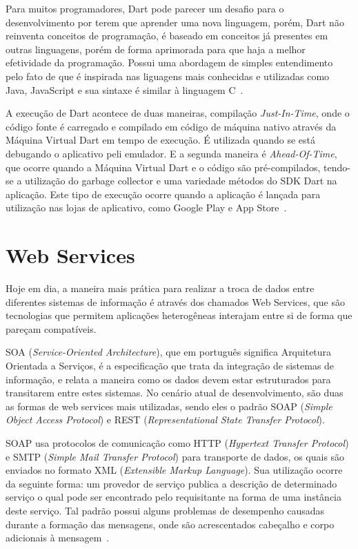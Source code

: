Para muitos programadores, Dart pode parecer um desafio para o desenvolvimento por terem que aprender uma nova linguagem, porém, Dart não reinventa conceitos de programação, é baseado em conceitos já presentes em outras linguagens, porém de forma aprimorada para que haja a melhor efetividade da programação.
Possui uma abordagem de simples entendimento pelo fato de que é inspirada nas liguagens mais conhecidas e utilizadas como Java, JavaScript e sua sintaxe é similar à linguagem C~\cite{clow2019flutter}.

A execução de Dart acontece de duas maneiras, compilação \textit{Just-In-Time}, onde o código fonte é carregado e compilado em código de máquina nativo através da Máquina Virtual Dart em tempo de execução.
É utilizada quando se está debugando o aplicativo peli emulador.
E a segunda maneira é \textit{Ahead-Of-Time}, que ocorre quando a Máquina Virtual Dart e o código são pré-compilados, tendo-se a utilização do garbage collector e uma variedade métodos do SDK Dart na aplicação.
Este tipo de execução ocorre quando a aplicação é lançada para utilização nas lojas de aplicativo, como Google Play e App Store~\cite{napoli2019beginning}.



\section{Web Services}\label{sec:web-services}


Hoje em dia, a maneira mais prática para realizar a troca de dados entre diferentes sistemas de informação é através dos chamados Web Services\cite{tihomirovs2016webservices}, que são tecnologias que permitem aplicações heterogêneas interajam entre si de forma que pareçam compatíveis\cite{eulalio2016webservices}.


SOA (\textit{Service-Oriented Architecture}), que em português significa Arquitetura Orientada a Serviços, é a especificação que trata da integração de sistemas de informação, e relata a maneira como os dados devem estar estruturados para transitarem entre estes sistemas\cite{eulalio2016webservices}.
No cenário atual de desenvolvimento, são duas as formas de web services mais utilizadas, sendo eles o padrão SOAP (\textit{Simple Object Access Protocol}) e REST (\textit{Representational State Transfer Protocol}).

SOAP usa protocolos de comunicação como HTTP (\textit{Hypertext Transfer Protocol}) e SMTP (\textit{Simple Mail Transfer Protocol}) para transporte de dados, os quais são enviados no formato XML (\textit{Extensible Markup Language}). Sua utilização ocorre da seguinte forma: um provedor de serviço publica a descrição de determinado serviço o qual pode ser encontrado pelo requisitante na forma de uma instância deste serviço.
Tal padrão possui alguns problemas de desempenho causadas durante a formação das mensagens, onde são acrescentados cabeçalho e corpo adicionais à mensagem~\cite{tihomirovs2016webservices}.

